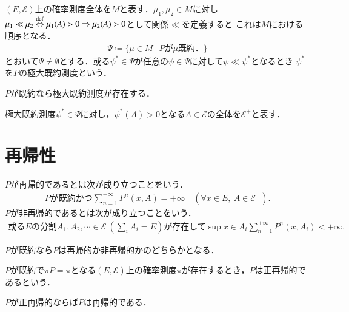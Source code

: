 	\begin{dfn}[極大既約測度]
		$(E, \mathcal{E})$上の確率測度全体を$M$と表す．$\mu_1, \mu_2 \in M$に対し
		$\mu_1 \ll \mu_2 \overset{\mathrm{def}}{\Leftrightarrow} \mu_1(A) > 0 \Rightarrow \mu_2(A) > 0$として関係$\ll$を定義すると
		これは$M$における順序となる．
		\begin{align}
			\Psi \coloneqq \{ \mu \in M\ |\ \mbox{$P$が$\mu$既約．} \}
		\end{align}
		とおいて$\Psi \neq \emptyset$とする．或る$\psi^* \in \Psi$が任意の$\psi \in \Psi$に対して$\psi \ll \psi^*$となるとき
		$\psi^*$を$P$の極大既約測度という．
	\end{dfn}
	
	\begin{prp}[極大既約測度の存在]
		$P$が既約なら極大既約測度が存在する．
	\end{prp}
	
	極大既約測度$\psi^* \in \Psi$に対し，$\psi^*(A) > 0$となる$A \in \mathcal{E}$の全体を$\mathcal{E}^+$と表す．

\section{再帰性}
	\begin{dfn}[再帰性]
		$P$が再帰的であるとは次が成り立つことをいう．
		\begin{align}
			\mbox{$P$が既約かつ} \sum_{n=1}^{+\infty} P^n(x,A) = +\infty \quad (\forall x \in E,\ A \in \mathcal{E}^+).
		\end{align}
		$P$が非再帰的であるとは次が成り立つことをいう．
		\begin{align}
			\mbox{或る$E$の分割$A_1,A_2,\cdots \in \mathcal{E}\ (\sum_{i}A_i = E)$が存在して} \sup{x \in A_i} \sum_{n=1}^{+\infty} P^n(x,A_i) < +\infty.
		\end{align}
	\end{dfn}
	
	\begin{prp}
		$P$が既約なら$P$は再帰的か非再帰的かのどちらかとなる．
	\end{prp}
	
	\begin{dfn}[正再帰性]
		 $P$が既約で$ \pi P = \pi$となる$(E,\mathcal{E})$上の確率測度$\pi$が存在するとき，$P$は正再帰的であるという．
	\end{dfn}
	
	\begin{prp}
		$P$が正再帰的ならば$P$は再帰的である．
	\end{prp}
	
